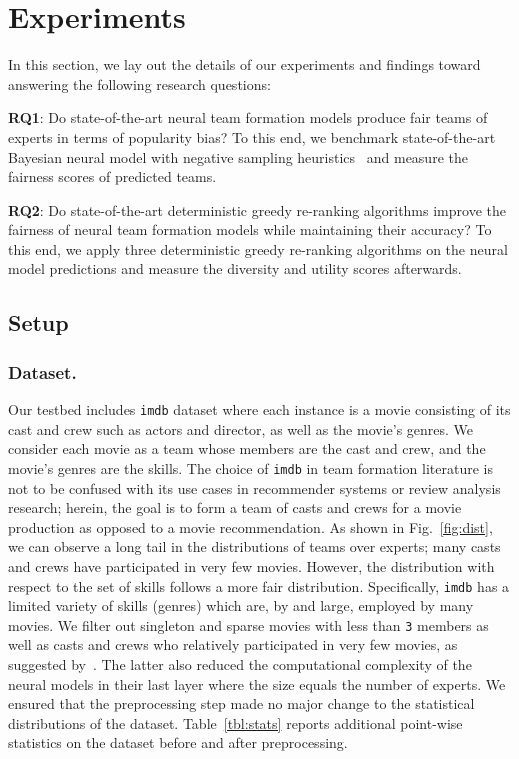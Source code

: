 \documentclass[runningheads]{llncs}
\begin{document}

\section{Experiments}
In this section, we lay out the details of our experiments and findings toward answering the following research questions:

\noindent\textbf{RQ1}: Do state-of-the-art neural team formation models produce fair teams of experts in terms of popularity bias? To this end, we benchmark state-of-the-art Bayesian neural model with negative sampling heuristics~\cite{DBLP:conf/cikm/DashtiSF22} and measure the fairness scores of predicted teams. 

\noindent\textbf{RQ2}: Do state-of-the-art deterministic greedy re-ranking algorithms improve the fairness of neural team formation models while maintaining their accuracy? To this end, we apply three deterministic greedy re-ranking algorithms on the neural model predictions and measure the diversity and utility scores afterwards.

\subsection{Setup}
\subsubsection{Dataset.}
Our testbed includes \texttt{imdb}\cite{DBLP:journals/tkde/KargarGSSZ22,kargar2011discovering} dataset where each instance is a movie consisting of its cast and crew such as actors and director, as well as the movie's genres. We consider each movie as a team whose members are the cast and crew, and the movie's genres are the skills. The choice of \texttt{imdb} in team formation literature is not to be confused with its use cases in recommender systems or review analysis research; herein, the goal is to form a team of casts and crews for a movie production as opposed to a movie recommendation. As shown in Fig.~\ref{fig:dist}, we can observe a long tail in the distributions of teams over experts; many casts and crews have participated in very few movies. However, the distribution with respect to the set of skills follows a more fair distribution. Specifically, \texttt{imdb} has a limited variety of skills (genres) which are, by and large, employed by many movies. We filter out singleton and sparse movies with less than \texttt{3} members as well as casts and crews who relatively participated in very few movies, as suggested by~\cite{10.1145/3511808.3557590,DBLP:conf/cikm/RadFKSB20}. The latter also reduced the computational complexity of the neural models in their last layer where the size equals the number of experts. We ensured that the preprocessing step made no major change to the statistical distributions of the dataset. Table~\ref{tbl:stats} reports additional point-wise statistics on the dataset before and after preprocessing.
\end{document}
